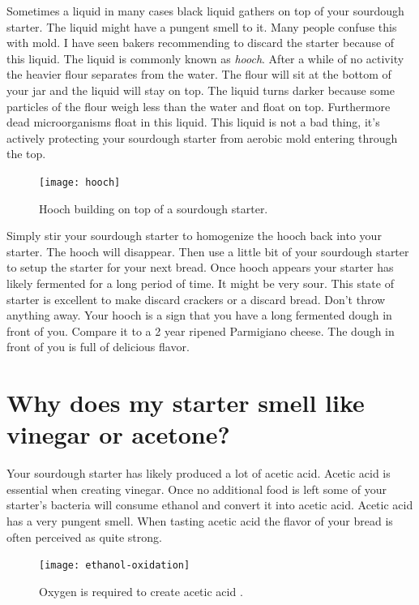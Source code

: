 Sometimes a liquid in many cases black liquid gathers on top
of your sourdough starter. The liquid might have a pungent
smell to it. Many people confuse this with mold. I have seen
bakers recommending to discard the starter because of this liquid.
The liquid is commonly known as {\it hooch}. After a while
of no activity the heavier flour separates from the water. The flour
will sit at the bottom of your jar and the liquid will stay on top.
The liquid turns darker because some particles of the flour weigh
less than the water and float on top. Furthermore dead microorganisms
float in this liquid. This liquid is not a bad thing, it's actively
protecting your sourdough starter from aerobic mold entering through
the top.

\begin{figure}[!htb]
  \centering
  \texttt{[image: hooch]}
  \caption{Hooch building on top of a sourdough starter. \cite{liquid+on+starter}}
  \label{fig:hooch}
\end{figure}

Simply stir your sourdough starter to homogenize the hooch back
into your starter. The hooch will disappear. Then use a little bit of
your sourdough starter to setup the starter for your next bread.
Once hooch appears your starter has likely fermented for a long
period of time. It might be very sour. This state of starter
is excellent to make discard crackers or a discard bread. Don't throw
anything away. Your hooch is a sign that you have a long fermented
dough in front of you. Compare it to a 2 year ripened Parmigiano cheese.
The dough in front of you is full of delicious flavor.

\section{Why does my starter smell like vinegar or acetone?}

Your sourdough starter has likely produced a lot of acetic acid.
Acetic acid is essential when creating vinegar. Once no additional
food is left some of your starter's bacteria will consume ethanol
and convert it into acetic acid. Acetic acid has a very pungent smell.
When tasting acetic acid the flavor of your bread is often perceived
as quite strong.

\begin{figure}[!htb]
  \centering
  \texttt{[image: ethanol-oxidation]}
  \caption{Oxygen is required to create acetic acid \cite{acetic+acid+production}.}
  \label{fig:ethanol-oxidation}
\end{figure}

